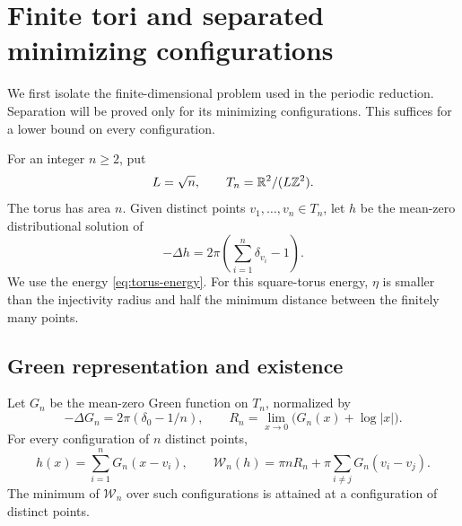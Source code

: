 \section{Finite tori and separated minimizing configurations}
\label{geo:section}\label{sec:geometry}

We first isolate the finite-dimensional problem used in the periodic
reduction.  Separation will be proved only for its minimizing
configurations.  This suffices for a lower bound on every configuration.

For an integer \(n\geq2\), put
\[
 L=\sqrt n,\qquad T_n=\mathbb R^2/(L\mathbb Z^2).
\]
The torus has area \(n\).  Given distinct points
\(v_1,\ldots,v_n\in T_n\), let \(h\) be the mean-zero distributional
solution of
\[
 -\Delta h=2\pi\left(\sum_{i=1}^n\delta_{v_i}-1\right).
\]
We use the energy \eqref{eq:torus-energy}. For this square-torus
energy, \(\eta\) is smaller than the injectivity radius and half the
minimum distance between the finitely many points.

\subsection{Green representation and existence}

\begin{lemma}
\label{geo:existence}
Let \(G_n\) be the mean-zero Green function on \(T_n\), normalized by
\[
 -\Delta G_n=2\pi(\delta_0-1/n),
 \qquad
 R_n=\lim_{x\to0}\bigl(G_n(x)+\log|x|\bigr).
\]
For every configuration of \(n\) distinct points,
\begin{equation}
 h(x)=\sum_{i=1}^nG_n(x-v_i),\qquad
 \mathcal W_n(h)=\pi nR_n+
                    \pi\sum_{i\ne j}G_n(v_i-v_j).
 \label{geo:pair-energy}
\end{equation}
The minimum of \(\mathcal W_n\) over such configurations is attained
at a configuration of distinct points.
\end{lemma}

